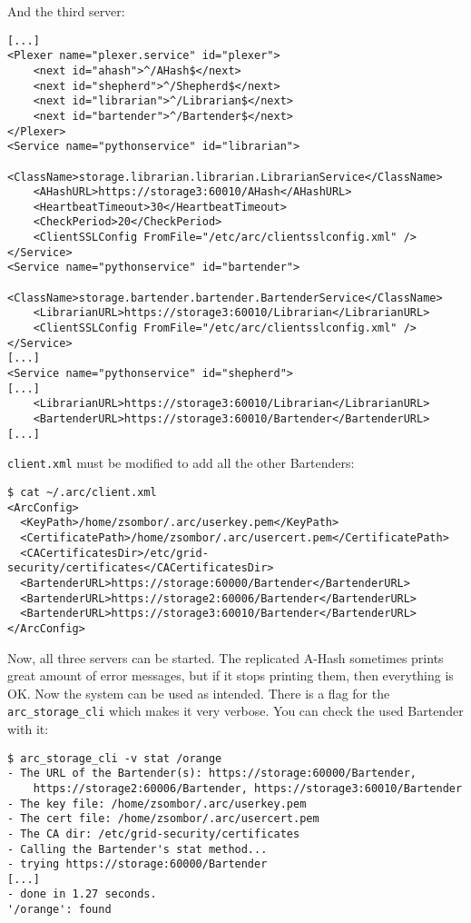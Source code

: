 \documentclass{article}
\begin{document}
And the third server:

\begin{verbatim}
[...]
<Plexer name="plexer.service" id="plexer">
    <next id="ahash">^/AHash$</next>
    <next id="shepherd">^/Shepherd$</next>
    <next id="librarian">^/Librarian$</next>
    <next id="bartender">^/Bartender$</next>
</Plexer>
<Service name="pythonservice" id="librarian">
    <ClassName>storage.librarian.librarian.LibrarianService</ClassName>
    <AHashURL>https://storage3:60010/AHash</AHashURL>
    <HeartbeatTimeout>30</HeartbeatTimeout>
    <CheckPeriod>20</CheckPeriod>
    <ClientSSLConfig FromFile="/etc/arc/clientsslconfig.xml" />
</Service>
<Service name="pythonservice" id="bartender">
    <ClassName>storage.bartender.bartender.BartenderService</ClassName>
    <LibrarianURL>https://storage3:60010/Librarian</LibrarianURL>
    <ClientSSLConfig FromFile="/etc/arc/clientsslconfig.xml" />
</Service>
[...]
<Service name="pythonservice" id="shepherd">
[...]
    <LibrarianURL>https://storage3:60010/Librarian</LibrarianURL>
    <BartenderURL>https://storage3:60010/Bartender</BartenderURL>
[...]
\end{verbatim}

\verb!client.xml! must be modified to add all the other Bartenders:

\begin{verbatim}
$ cat ~/.arc/client.xml 
<ArcConfig>
  <KeyPath>/home/zsombor/.arc/userkey.pem</KeyPath>
  <CertificatePath>/home/zsombor/.arc/usercert.pem</CertificatePath>
  <CACertificatesDir>/etc/grid-security/certificates</CACertificatesDir>
  <BartenderURL>https://storage:60000/Bartender</BartenderURL>
  <BartenderURL>https://storage2:60006/Bartender</BartenderURL>
  <BartenderURL>https://storage3:60010/Bartender</BartenderURL>
</ArcConfig>
\end{verbatim}

Now, all three servers can be started. The replicated A-Hash sometimes prints great amount of error messages, but if it stops printing them, then everything is OK. Now the system can be used as intended. There is a flag for the \verb!arc_storage_cli! which makes it very verbose. You can check the used Bartender with it:

\begin{verbatim}
$ arc_storage_cli -v stat /orange
- The URL of the Bartender(s): https://storage:60000/Bartender,
    https://storage2:60006/Bartender, https://storage3:60010/Bartender
- The key file: /home/zsombor/.arc/userkey.pem
- The cert file: /home/zsombor/.arc/usercert.pem
- The CA dir: /etc/grid-security/certificates
- Calling the Bartender's stat method...
- trying https://storage:60000/Bartender
[...]
- done in 1.27 seconds.
'/orange': found
\end{verbatim}
\end{document}
